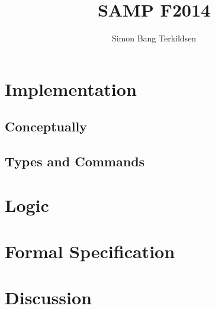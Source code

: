 \documentclass[citeauthoryear]{llncs} %
\title{SAMP F2014}
\author{Simon Bang Terkildsen}
\institute{IT University of Copenhagen}
\theoremstyle{definition}
\theoremstyle{notation}
\begin{document}
\maketitle

\begin{abstract}

\end{abstract}



\section{Implementation}

\subsection{Conceptually}




\subsection{Types and Commands}





\section{Logic}


\section{Formal Specification}



\section{Discussion}






\end{document}
